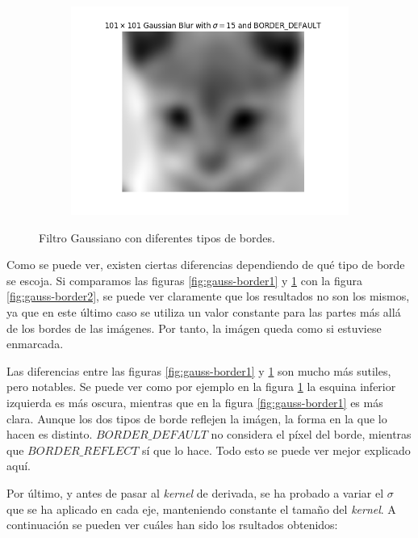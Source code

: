 \documentclass[11pt,a4paper]{article}
\begin{document}
\begin{figure}[H]\ContinuedFloat
\begin{subfigure}{\textwidth}
	\centering
	\includegraphics[scale=0.5]{img/gauss-border3.png}
	\label{fig:gauss-border3}
\end{subfigure}
\caption{Filtro Gaussiano con diferentes tipos de bordes.}
\label{fig:gauss-borders}
\end{figure}

Como se puede ver, existen ciertas diferencias dependiendo de qué tipo de borde se escoja. Si comparamos las figuras
\ref{fig:gauss-border1} y \ref{fig:gauss-border3} con la figura \ref{fig:gauss-border2}, se puede ver claramente que
los resultados no son los mismos, ya que en este último caso se utiliza un valor constante para las partes más allá
de los bordes de las imágenes. Por tanto, la imágen queda como si estuviese enmarcada.

Las diferencias entre las figuras \ref{fig:gauss-border1} y \ref{fig:gauss-border3} son mucho más sutiles, pero notables.
Se puede ver como por ejemplo en la figura \ref{fig:gauss-border3} la esquina inferior izquierda es más oscura, mientras
que en la figura \ref{fig:gauss-border1} es más clara. Aunque los dos tipos de borde reflejen la imágen, la forma en la
que lo hacen es distinto. $BORDER\_DEFAULT$ no considera el píxel del borde, mientras que $BORDER\_REFLECT$ sí que lo hace.
Todo esto se puede ver mejor explicado aquí\cite{opencv-border}.

Por último, y antes de pasar al \textit{kernel} de derivada, se ha probado a variar el $\sigma$ que se ha aplicado en cada
eje, manteniendo constante el tamaño del \textit{kernel}. A continuación se pueden ver cuáles han sido los rsultados obtenidos:
\end{document}
